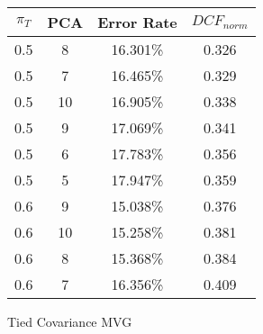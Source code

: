\begin{tabular}{|c|c|c|c|}
\hline
$\pi_T$ & PCA & Error Rate & $DCF_{norm}$\\
\hline
0.5 & 8 & 16.301\% & 0.326\\
\hline
0.5 & 7 & 16.465\% & 0.329\\
\hline
0.5 & 10 & 16.905\% & 0.338\\
\hline
0.5 & 9 & 17.069\% & 0.341\\
\hline
0.5 & 6 & 17.783\% & 0.356\\
\hline
0.5 & 5 & 17.947\% & 0.359\\
\hline
0.6 & 9 & 15.038\% & 0.376\\
\hline
0.6 & 10 & 15.258\% & 0.381\\
\hline
0.6 & 8 & 15.368\% & 0.384\\
\hline
0.6 & 7 & 16.356\% & 0.409\\
\hline
\end{tabular}
\caption{Tied Covariance MVG}\label{tab:mvg_tiedcov}
